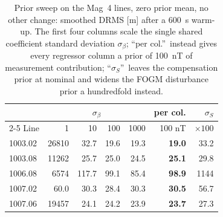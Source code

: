 \begin{table}[t]
\caption{Prior sweep on the Mag~4 lines, zero prior mean, no other change:
smoothed DRMS [m] after a \SI{600}{\second} warm-up. The first four columns scale
the single shared coefficient standard deviation $\sigma_{\beta}$; ``per col.''\
instead gives every regressor column a prior of \SI{100}{\nano\tesla} of
measurement contribution; ``$\sigma_S$''\ leaves the compensation prior at
nominal and widens the FOGM disturbance prior a hundredfold instead.}
\label{tab:priorsweep}
\centering
\setlength{\tabcolsep}{4pt}
\begin{tabular}{l rrrr rr}
\toprule
 & \multicolumn{4}{c}{$\sigma_{\beta}$} & per col. & $\sigma_S$ \\
\cmidrule(lr){2-5}
Line & 1 & 10 & 100 & 1000 & 100 nT & $\times100$ \\
\midrule
1003.02 & 26810 & 32.7 & 19.6 & 19.3 & \textbf{19.0} & 33.2 \\
1003.08 & 11262 & 25.7 & 25.0 & 24.5 & \textbf{25.1} & 29.8 \\
1006.08 & 6574 & 117.7 & 99.1 & 85.4 & \textbf{98.9} & 1144 \\
1007.02 & 60.0 & 30.3 & 28.4 & 30.3 & \textbf{30.5} & 56.7 \\
1007.06 & 19457 & 24.1 & 24.2 & 23.9 & \textbf{23.7} & 27.3 \\
\bottomrule
\end{tabular}
\end{table}

